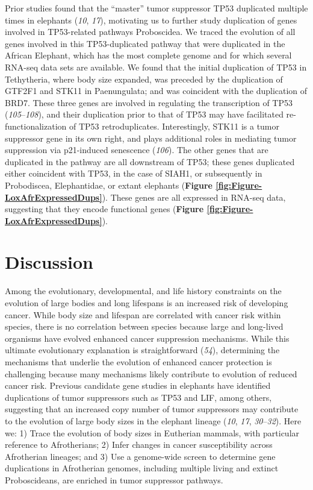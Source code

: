 \documentclass[]{elsarticle} %
\begin{document}
Prior studies found that the ``master'' tumor suppressor TP53 duplicated multiple times in elephants (\emph{10}, \emph{17}), motivating us to further study duplication of genes involved in TP53-related pathways Proboscidea. We traced the evolution of all genes involved in this TP53-duplicated pathway that were duplicated in the African Elephant, which has the most complete genome and for which several RNA-seq data sets are available. We found that the initial duplication of TP53 in Tethytheria, where body size expanded, was preceded by the duplication of GTF2F1 and STK11 in Paenungulata; and was coincident with the duplication of BRD7. These three genes are involved in regulating the transcription of TP53 (\emph{105}--\emph{108}), and their duplication prior to that of TP53 may have facilitated re-functionalization of TP53 retroduplicates. Interestingly, STK11 is a tumor suppressor gene in its own right, and plays additional roles in mediating tumor suppression via p21-induced senescence (\emph{106}). The other genes that are duplicated in the pathway are all downstream of TP53; these genes duplicated either coincident with TP53, in the case of SIAH1, or subsequently in Probodiscea, Elephantidae, or extant elephants (\textbf{Figure \ref{fig:Figure-LoxAfrExpressedDups}}). These genes are all expressed in RNA-seq data, suggesting that they encode functional genes (\textbf{Figure \ref{fig:Figure-LoxAfrExpressedDups}}).

\hypertarget{discussion}{%
\section{Discussion}\label{discussion}}

Among the evolutionary, developmental, and life history constraints on the evolution of large bodies and long lifespans is an increased risk of developing cancer. While body size and lifespan are correlated with cancer risk within species, there is no correlation between species because large and long-lived organisms have evolved enhanced cancer suppression mechanisms. While this ultimate evolutionary explanation is straightforward (\emph{54}), determining the mechanisms that underlie the evolution of enhanced cancer protection is challenging because many mechanisms likely contribute to evolution of reduced cancer risk. Previous candidate gene studies in elephants have identified duplications of tumor suppressors such as TP53 and LIF, among others, suggesting that an increased copy number of tumor suppressors may contribute to the evolution of large body sizes in the elephant lineage (\emph{10}, \emph{17}, \emph{30}--\emph{32}). Here we: 1) Trace the evolution of body sizes in Eutherian mammals, with particular reference to Afrotherians; 2) Infer changes in cancer susceptibility across Afrotherian lineages; and 3) Use a genome-wide screen to determine gene duplications in Afrotherian genomes, including multiple living and extinct Proboscideans, are enriched in tumor suppressor pathways.
\end{document}
